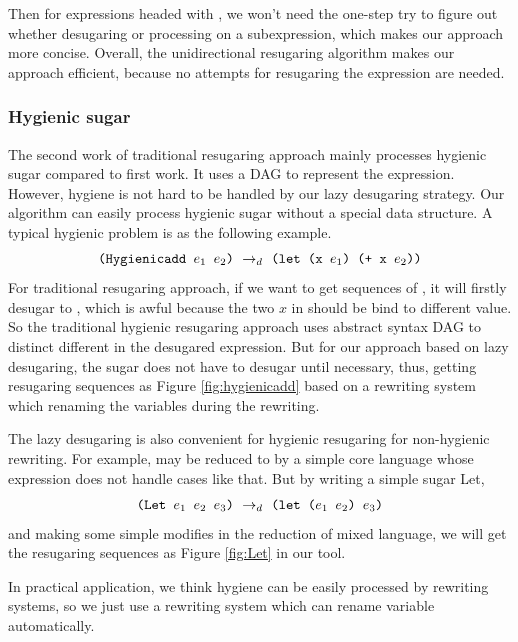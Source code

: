 Then for expressions headed with , we won't need the one-step try to figure out whether desugaring or processing on a subexpression, which makes our approach more concise. Overall, the unidirectional resugaring algorithm makes our approach efficient, because no attempts for resugaring the expression are needed.
\subsubsection{Hygienic sugar}
\label{mark:hygienic}


The second work\cite{hygienic} of traditional resugaring approach mainly processes hygienic sugar compared to first work. It uses a DAG to represent the expression. However, hygiene is not hard to be handled by our lazy desugaring strategy. Our algorithm can easily process hygienic sugar without a special data structure.
A typical hygienic problem is as the following example.
\[
\texttt{(Hygienicadd $e_1$ $e_2$)} ~\rightarrow_d~ \texttt{(let (x $e_1$) (+ x $e_2$))}
\]
For traditional resugaring approach, if we want to get sequences of , it will firstly desugar to , which is awful because the two $x$ in  should be bind to different value. So the traditional hygienic resugaring approach uses abstract syntax DAG to distinct different  in the desugared expression. But for our approach based on lazy desugaring, the  sugar does not have to desugar until necessary, thus, getting resugaring sequences as Figure \ref{fig:hygienicadd} based on a  rewriting system which renaming the variables during the rewriting.


The lazy desugaring is also convenient for hygienic resugaring for non-hygienic rewriting. For example,  may be reduced to  by a simple core language whose  expression does not handle cases like that. But by writing a simple sugar Let,
\[\texttt{(Let~$e_1$~$e_2$~$e_3$)} ~\rightarrow_d~ \texttt{(let~($e_1$~$e_2$)~$e_3$)}\]
and making some simple modifies in the reduction of mixed language, we will get the resugaring sequences as Figure \ref{fig:Let} in our tool.


In practical application, we think hygiene can be easily processed by rewriting systems, so we just use a rewriting system which can rename variable automatically. 

